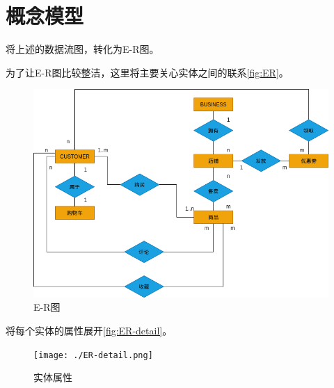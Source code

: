 \documentclass[UTF8，12pt, a4paper]{ctexart}
\begin{document}
\section{概念模型}

将上述的数据流图，转化为E-R图。

为了让E-R图比较整洁，这里将主要关心实体之间的联系\autoref{fig:ER}。

\begin{figure}[ht]
    \centering
    \includegraphics[width=\textwidth]{./ER.png}
    \caption{E-R图  }
    \label{fig:ER}
\end{figure}

将每个实体的属性展开\autoref{fig:ER-detail}。

\begin{figure}[ht]
    \centering
    \texttt{[image: ./ER-detail.png]}
    \caption{实体属性}
    \label{fig:ER-detail}
\end{figure}



\newpage


\end{document}

